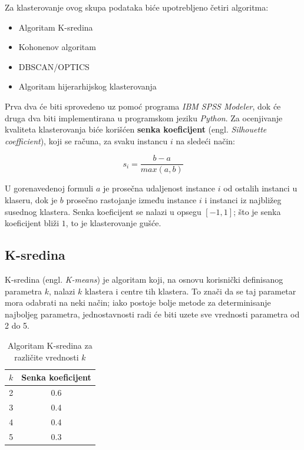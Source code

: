 \documentclass[a4paper]{article}
\begin{document}
Za klasterovanje ovog skupa podataka biće upotrebljeno četiri algoritma:
\begin{itemize}
  \item{Algoritam K-sredina}
  \item{Kohonenov algoritam}
  \item{DBSCAN/OPTICS}
  \item{Algoritam hijerarhijskog klasterovanja}
\end{itemize}

Prva dva će biti sprovedeno uz pomoć programa \textit{IBM SPSS Modeler}, dok će druga dva biti implementirana u programskom jeziku \textit{Python}. Za ocenjivanje kvaliteta klasterovanja biće korišćen \textbf{senka koeficijent} (engl. \textit{Silhouette coefficient}), koji se računa, za svaku instancu $i$ na sledeći način:

$$ s_i = \frac{b-a}{max(a, b)} $$

U gorenavedenoj formuli $a$ je prosečna udaljenost instance $i$ od ostalih instanci u klaseru, dok je $b$ prosečno rastojanje između instance $i$ i instanci iz najbližeg susednog klastera. Senka koeficijent se nalazi u opsegu $[-1, 1]$; što je senka koeficijent bliži $1$, to je klasterovanje gušće.

\subsection{K-sredina}
\label{subsec:ksredina}

K-sredina (engl. \textit{K-means}) je algoritam koji, na osnovu korisnički definisanog parametra $k$, nalazi $k$ klastera i centre tih klastera. To znači da se taj parametar mora odabrati na neki način; iako postoje bolje metode za determinisanje najboljeg parametra, jednostavnosti radi će biti uzete sve vrednosti parametra od 2 do 5.

\begin{table}[h!]
\begin{center}
\caption{Algoritam K-sredina za različite vrednosti $k$}
\begin{tabular}{|c|c|} \hline
$k$ & Senka koeficijent\\ \hline
2 & 0.6\\
3 & 0.4\\
4 & 0.4\\
5 & 0.3\\ \hline
\end{tabular}
\label{tab:tabela1}
\end{center}
\end{table}
\end{document}
